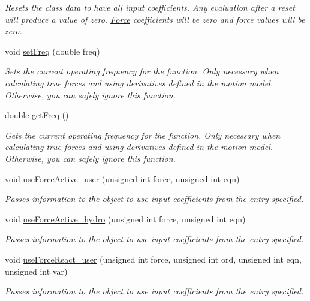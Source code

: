 \begin{DoxyCompactItemize}
\begin{DoxyCompactList}\small\item\em Resets the class data to have all input coefficients. Any evaluation after a reset will produce a value of zero. \hyperlink{class_force}{Force} coefficients will be zero and force values will be zero. \end{DoxyCompactList}\item 
void \hyperlink{class_motion_model_a18e880b4a0b1a1d1c385bc3be3524440}{set\-Freq} (double freq)
\begin{DoxyCompactList}\small\item\em Sets the current operating frequency for the function. Only necessary when calculating true forces and using derivatives defined in the motion model. Otherwise, you can safely ignore this function. \end{DoxyCompactList}\item 
double \hyperlink{class_motion_model_a3461ede3739b468b6bab3a05f94093cc}{get\-Freq} ()
\begin{DoxyCompactList}\small\item\em Gets the current operating frequency for the function. Only necessary when calculating true forces and using derivatives defined in the motion model. Otherwise, you can safely ignore this function. \end{DoxyCompactList}\item 
void \hyperlink{class_motion_model_aaf761fac4693612a10771e38993431a0}{use\-Force\-Active\-\_\-user} (unsigned int force, unsigned int eqn)
\begin{DoxyCompactList}\small\item\em Passes information to the object to use input coefficients from the entry specified. \end{DoxyCompactList}\item 
void \hyperlink{class_motion_model_a4d3e0590135e1a9f7ce954406f99ff44}{use\-Force\-Active\-\_\-hydro} (unsigned int force, unsigned int eqn)
\begin{DoxyCompactList}\small\item\em Passes information to the object to use input coefficients from the entry specified. \end{DoxyCompactList}\item 
void \hyperlink{class_motion_model_a7db1d1ebebe216d17efd7b38f2e9deec}{use\-Force\-React\-\_\-user} (unsigned int force, unsigned int ord, unsigned int eqn, unsigned int var)
\begin{DoxyCompactList}\small\item\em Passes information to the object to use input coefficients from the entry specified. \end{DoxyCompactList}\item 

\end{DoxyCompactItemize}
